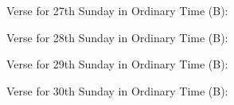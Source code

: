 \documentclass[11pt]{book} %
\begin{document}
\begin{paragraph}\noindent\begin{large}
Verse for 27th Sunday in Ordinary Time (B):
\end{large}\newline\end{paragraph}


\begin{paragraph}\noindent\begin{large}
Verse for 28th Sunday in Ordinary Time (B):
\end{large}\newline\end{paragraph}


\begin{paragraph}\noindent\begin{large}
Verse for 29th Sunday in Ordinary Time (B):
\end{large}\newline\end{paragraph}


\begin{paragraph}\noindent\begin{large}
Verse for 30th Sunday in Ordinary Time (B):
\end{large}\newline\end{paragraph}

\end{document}

